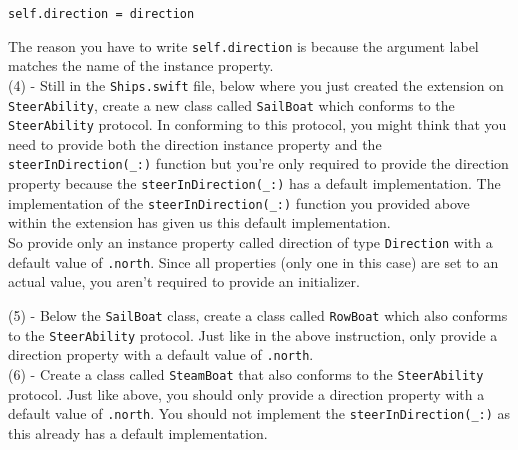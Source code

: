 \documentclass[a4paper,11pt]{scrartcl}
\begin{document}
\begin{lstlisting}
self.direction = direction
\end{lstlisting}

The reason you have to write \texttt{self.direction} is because the argument label matches the name of the instance property.\\

(4) - Still in the \texttt{Ships.swift} file, below where you just created the extension on \texttt{SteerAbility}, create a new class called \texttt{SailBoat} which conforms to the \texttt{SteerAbility} protocol. In conforming to this protocol, you might think that you need to provide both the direction instance property and the \texttt{steerInDirection(\_:)} function but you're only required to provide the direction property because the \texttt{steerInDirection(\_:)} has a default implementation. The implementation of the \texttt{steerInDirection(\_:)} function you provided above within the extension has given us this default implementation.\\

So provide only an instance property called direction of type \texttt{Direction} with a default value of \texttt{.north}. Since all properties (only one in this case) are set to an actual value, you aren't required to provide an initializer.

(5) - Below the \texttt{SailBoat} class, create a class called \texttt{RowBoat} which also conforms to the \texttt{SteerAbility} protocol. Just like in the above instruction, only provide a direction property with a default value of \texttt{.north}.\\

(6) - Create a class called \texttt{SteamBoat} that also conforms to the \texttt{SteerAbility} protocol. Just like above, you should only provide a direction property with a default value of \texttt{.north}. You should not implement the \texttt{steerInDirection(\_:)} as this already has a default implementation.
\end{document}
